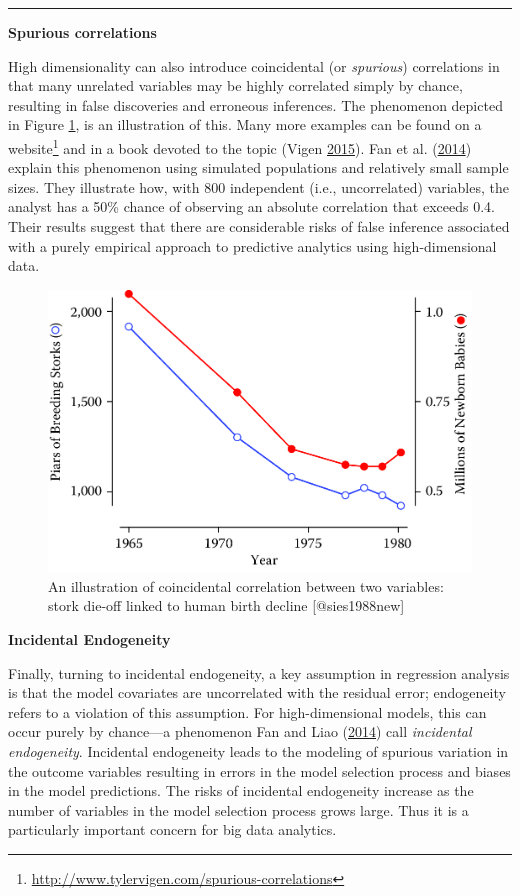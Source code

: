 \documentclass[]{krantz}
\begin{document}
\begin{center}\rule{0.5\linewidth}{\linethickness}\end{center}

\textbf{Spurious correlations}

High dimensionality can also introduce coincidental (or \emph{spurious})
correlations in that many unrelated variables may be highly correlated
simply by chance, resulting in false discoveries and erroneous
inferences. The phenomenon depicted in Figure \ref{fig:fig10-3}, is an
illustration of this. Many more examples can be found on a
website\footnote{\url{http://www.tylervigen.com/spurious-correlations}}
and in a book devoted to the topic (Vigen
\protect\hyperlink{ref-spurious2}{2015}). Fan et al.
(\protect\hyperlink{ref-fan2014challenges}{2014}) explain this
phenomenon using simulated populations and relatively small sample
sizes. They illustrate how, with 800 independent (i.e., uncorrelated)
variables, the analyst has a 50\% chance of observing an absolute
correlation that exceeds 0.4. Their results suggest that there are
considerable risks of false inference associated with a purely empirical
approach to predictive analytics using high-dimensional data.

\begin{figure}

{\centering \includegraphics[width=0.7\linewidth]{ChapterError/figures/fig10-3} 

}

\caption{An illustration of coincidental correlation between two variables: stork die-off linked to human birth decline [@sies1988new]}\label{fig:fig10-3}
\end{figure}

\textbf{Incidental Endogeneity}

Finally, turning to incidental endogeneity, a key assumption in
regression analysis is that the model covariates are uncorrelated with
the residual error; endogeneity refers to a violation of this
assumption. For high-dimensional models, this can occur purely by
chance---a phenomenon Fan and Liao
(\protect\hyperlink{ref-fan2014endogeneity}{2014}) call \emph{incidental
endogeneity}. Incidental endogeneity leads to the modeling of spurious
variation in the outcome variables resulting in errors in the model
selection process and biases in the model predictions. The risks of
incidental endogeneity increase as the number of variables in the model
selection process grows large. Thus it is a particularly important
concern for big data analytics.
\end{document}
